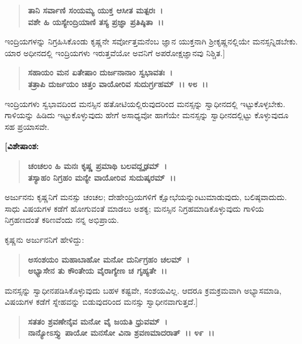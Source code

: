 \begin{verse}
\textbf{ತಾನಿ ಸರ್ವಾಣಿ ಸಂಯಮ್ಯ ಯುಕ್ತ ಆಸೀತ ಮತ್ಪರಃ~।}\\\textbf{ವಶೇ ಹಿ ಯಸ್ಯೇಂದ್ರಿಯಾಣಿ ತಸ್ಯ ಪ್ರಜ್ಞಾ ಪ್ರತಿಷ್ಠಿತಾ~।।}
\end{verse}

ಇಂದ್ರಿಯಗಳನ್ನು ನಿಗ್ರಹಿಸಿಕೊಂಡು ಕೃಷ್ಣನೇ ಸರ್ವೋತ್ತಮನೆಂಬ ಜ್ಞಾನ ಯುಕ್ತನಾಗಿ ಶ‍್ರೀಕೃಷ್ಣನಲ್ಲಿಯೇ ಮನಸ್ಸನ್ನಿಡಬೇಕು. ಯಾರ ಅಧೀನದಲ್ಲಿ ಇಂದ್ರಿಯಗಳು ಇರುತ್ತವೆಯೋ ಅವನಿಗೆ ಅಪರೋಕ್ಷಜ್ಞಾನವು ನಿಶ್ಚಿತ.]

\begin{verse}
\textbf{ಸಹಾಯಂ ಮನ ಏತೇಷಾಂ ದುರ್ಜನಾನಾಂ ಸ್ವಭಾವತಃ~।}\\\textbf{ತತ್ರಾಪಿ ದುರ್ಜಯಂ ಚಿತ್ತಂ ವಾಯೋರಿವ ಸುದುರ್ಗ್ರಹಮ್~।। ೪೮~।।}
\end{verse}

ಇಂದ್ರಿಯಗಳು ಸ್ವಭಾವದಿಂದ ಮನಸ್ಸಿನ ಹತೋಟಿಯಲ್ಲಿರುವುದರಿಂದ ಮನಸ್ಸನ್ನು ಸ್ವಾಧೀನದಲ್ಲಿ ಇಟ್ಟುಕೊಳ್ಳಬೇಕು. ಗಾಳಿಯನ್ನು ಹಿಡಿದು ಇಟ್ಟುಕೊಳ್ಳುವುದು ಹೇಗೆ ಅಸಾಧ್ಯವೋ ಹಾಗೆಯೇ ಮನಸ್ಸನ್ನು ಸ್ವಾಧೀನದಲ್ಲಿಟ್ಟು ಕೊಳ್ಳುವುದೂ ಸಹ ಪ್ರಯಾಸವೇ. 

\newpage

\begin{flushleft}
\textbf{[ವಿಶೇಷಾಂಶ:}
\end{flushleft}

\begin{verse}
\textbf{ಚಂಚಲಂ ಹಿ ಮನಃ ಕೃಷ್ಣ ಪ್ರಮಾಥಿ ಬಲವದ್ದೃಢಮ್~।}\\\textbf{ತಸ್ಯಾಹಂ ನಿಗ್ರಹಂ ಮನ್ಯೇ ವಾಯೋರಿವ ಸುದುಷ್ಕರಮ್~।।} 
\end{verse}

ಅರ್ಜುನನು ಕೃಷ್ಣನಿಗೆ ಮನಸ್ಸು ಚಂಚಲ; ದೇಹೇಂದ್ರಿಯಗಳಿಗೆ ಕ್ಷೋಭೆಯನ್ನುಂಟುಮಾಡುವುದು, ಬಲಿಷ್ಠವಾದುದು. ಸಾಧು ವಿಷಯಗಳ ಕಡೆಗೆ ಹೋಗುವಂತೆ ಮಾಡಲು ಅಶಕ್ಯ; ಮನಸ್ಸಿನ ನಿಗ್ರಹಮಾಡಿಕೊಳ್ಳುವುದು ಗಾಳಿಯ ನಿಗ್ರಹಣದಂತೆ ಕಠಿಣವೆಂದು ನನ್ನ ಅಭಿಪ್ರಾಯ.

\begin{flushleft}
ಕೃಷ್ಣನು ಅರ್ಜುನನಿಗೆ ಹೇಳಿದ್ದು:
\end{flushleft}

\begin{verse}
\textbf{ಅಸಂಶಯಂ ಮಹಾಬಾಹೋ ಮನೋ ದುರ್ನಿಗ್ರಹಂ ಚಲಮ್~।}\\\textbf{ಅಭ್ಯಾಸೇನ ತು ಕೌಂತೇಯ ವೈರಾಗ್ಯೇಣ ಚ ಗೃಹ್ಯತೇ~।।} 
\end{verse}

ಮನಸ್ಸನ್ನು ಸ್ವಾಧೀನಪಡಿಸಿಕೊಳ್ಳುವುದು ಬಹಳ ಕಷ್ಟವೇ, ಸಂಶಯವಿಲ್ಲ. ಆದರೂ ಕ್ರಮಕ್ರಮವಾಗಿ ಅಭ್ಯಾಸಮಾಡಿ, ವಿಷಯಗಳ ಕಡೆಗೆ ಸ್ನೇಹವನ್ನು ಬಿಡುವುದರಿಂದ ಮನಸ್ಸು ಸ್ವಾಧೀನವಾಗುತ್ತದೆ.]

\begin{verse}
\textbf{ಸತತಂ ಶ್ರವಣೇನೈವ ಮನೋ ವೈ ಜಯತಿ ಧ್ರುವಮ್~।}\\\textbf{ನಾನ್ಯೋಽಸ್ತ್ಯು ಪಾಯೋ ಮನಸೋ ವಿನಾ ಶ್ರವಣಮಾದರಾತ್~।। ೪೯~।।}
\end{verse}

